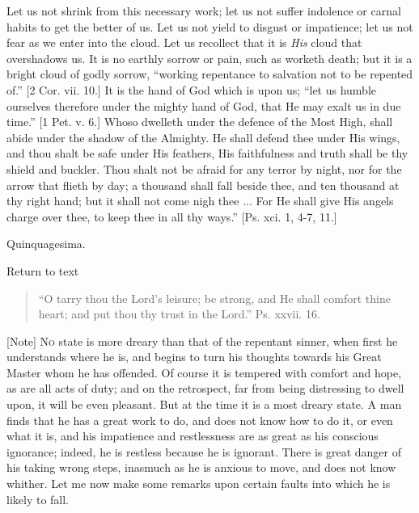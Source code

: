 Let us not shrink from this necessary work; let us not suffer
indolence or carnal habits to get the better of us. Let us not yield
to disgust or impatience; let us not fear as we enter into the cloud.
Let us recollect that it is \emph{His} cloud that overshadows us. It
is no earthly sorrow or pain, such as worketh death; but it is a
bright cloud of godly sorrow, ``working repentance to salvation
not to be repented of.'' [2 Cor. vii. 10.] It is the hand of God
which is upon us; ``let us humble ourselves therefore under the
mighty hand of God, that He may exalt us in due time.'' [1 Pet. v.
6.] Whoso dwelleth under the defence of the Most High, shall abide
under the shadow of the Almighty. He shall defend thee under His
wings, and thou shalt be safe under His feathers, His faithfulness and
truth shall be thy shield and buckler. Thou shalt not be afraid for
any terror by night, nor for the arrow that flieth by day; a thousand
shall fall beside thee, and ten thousand at thy right hand; but it
shall not come nigh thee ... For He shall give His angels charge over
thee, to keep thee in all thy ways.'' [Ps. xci. 1, 4-7, 11.]


Quinquagesima.

Return to text


\begin{quote}

``O tarry thou the Lord's leisure; be strong, and He shall
comfort thine heart; and put thou thy trust in the Lord.'' Ps.
xxvii. 16.

\end{quote}

[Note] N\textsc{o} state is more dreary than that of the repentant sinner, when
first he understands where he is, and begins to turn his thoughts
towards his Great Master whom he has offended.
Of course it is tempered with comfort and hope, as are all acts of
duty; and on the retrospect, far from being distressing to dwell upon,
it will be even pleasant. But at the time it is a most dreary state. A
man finds that he has a great work to do, and does not know how to do
it, or even what it is, and his impatience and restlessness are as
great as his conscious ignorance; indeed, he is restless because he is
ignorant. There is great danger of his taking wrong steps, inasmuch as
he is anxious to move, and does not know whither. Let me now make some
remarks upon certain faults into which he is likely to fall.

